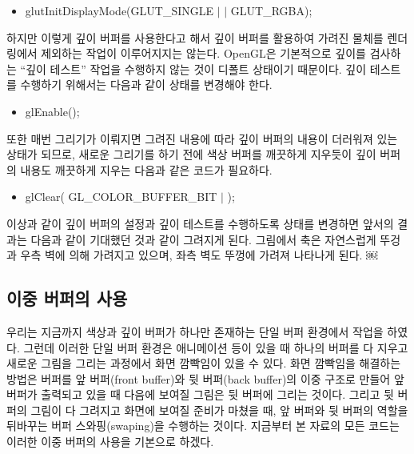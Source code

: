 \begin{itemize}
\item{\sf glutInitDisplayMode(GLUT\_SINGLE $|$ \color{red}{GLUT\_DEPTH} $|$ GLUT\_RGBA);}
\end{itemize}

하지만 이렇게 깊이 버퍼를 사용한다고 해서 깊이 버퍼를 활용하여 가려진 물체를 렌더링에서 제외하는 작업이 이루어지지는 않는다. OpenGL은 기본적으로 깊이를 검사하는 “깊이 테스트” 작업을 수행하지 않는 것이 디폴트 상태이기 때문이다. 깊이 테스트를 수행하기 위해서는 다음과 같이 상태를 변경해야 한다.

\begin{itemize}
\item{\sf glEnable(\color{red}{GL\_DEPTH\_TEST});}
\end{itemize}

또한 매번 그리기가 이뤄지면 그려진 내용에 따라 깊이 버퍼의 내용이 더러워져 있는 상태가 되므로, 새로운 그리기를 하기 전에 색상 버퍼를 깨끗하게 지우듯이 깊이 버퍼의 내용도 깨끗하게 지우는 다음과 같은 코드가 필요하다.

\begin{itemize}
\item{\sf glClear( GL\_COLOR\_BUFFER\_BIT $|$ \color{red}{GL\_DEPTH\_BUFFER\_BIT});}
\end{itemize}
이상과 같이 깊이 버퍼의 설정과 깊이 테스트를 수행하도록 상태를 변경하면 앞서의 결과는 다음과 같이 기대했던 것과 같이 그려지게 된다.
그림에서 축은 자연스럽게 뚜겅과 우측 벽에 의해 가려지고 있으며, 좌측 벽도 뚜껑에 가려져 나타나게 된다.
￼

\subsection{이중 버퍼의 사용}

우리는 지금까지 색상과 깊이 버퍼가 하나만 존재하는 단일 버퍼 환경에서 작업을 하였다. 그런데 이러한 단일 버퍼 환경은 애니메이션 등이 있을 때 하나의 버퍼를 다 지우고 새로운 그림을 그리는 과정에서 화면 깜빡임이 있을 수 있다.
화면 깜빡임을 해결하는 방법은 버퍼를 앞 버퍼(front buffer)와 뒷 버퍼(back buffer)의 이중 구조로 만들어 앞 버퍼가 출력되고 있을 때 다음에 보여질 그림은 뒷 버퍼에 그리는 것이다. 그리고 뒷 버퍼의 그림이 다 그려지고 화면에 보여질 준비가 마쳤을 때, 앞 버퍼와 뒷 버퍼의 역할을 뒤바꾸는 버퍼 스와핑(swaping)을 수행하는 것이다. 지금부터 본 자료의 모든 코드는 이러한 이중 버퍼의 사용을 기본으로 하겠다. 

